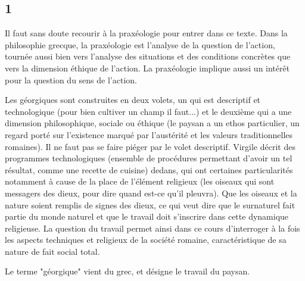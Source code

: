 \documentclass[a4paper,12pt]{book}
\begin{document}
\subsection{1}
Il faut sans doute recourir à la praxéologie pour entrer dans ce texte. Dans la philosophie grecque, la praxéologie est l'analyse de la question de l'action, tournée aussi bien vers l'analyse des situations et des conditions concrètes que vers la dimension éthique de l'action. La praxéologie implique aussi un intérêt pour la question du sens de l'action.
\par Les géorgiques sont construites en deux volets, un qui est descriptif et technologique (pour bien cultiver un champ il faut...) et le deuxième qui a une dimension philosophique, sociale ou éthique (le paysan a un ethos particulier, un regard porté sur l'existence marqué par l'austérité et les valeurs traditionnelles romaines). Il ne faut pas se faire piéger par le volet descriptif. Virgile décrit des programmes technologiques (ensemble de procédures permettant d'avoir un tel résultat, comme une recette de cuisine) dedans, qui ont certaines particularités notamment à cause de la place de l'élément religieux (les oiseaux qui sont messagers des dieux, pour dire quand est-ce qu'il pleuvra). Que les oiseaux et la nature soient remplis de signes des dieux, ce qui veut dire que le surnaturel fait partie du monde naturel et que le travail doit s'inscrire dans cette dynamique religieuse. La question du travail permet ainsi dans ce cours d'interroger à la fois les aspects techniques et religieux de la société romaine, caractéristique de sa nature de fait social total.
\par Le terme "géorgique" vient du grec, et désigne le travail du paysan.
\end{document}
